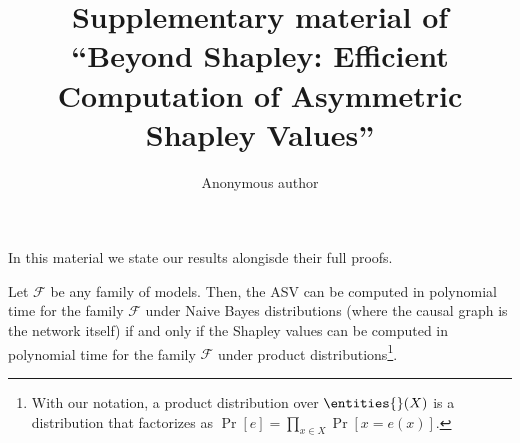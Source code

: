 \documentclass{llncs}
\begin{document}
%
\title{Supplementary material of ``Beyond Shapley: Efficient Computation of Asymmetric Shapley Values''}

%
\author{Anonymous author}
%
%
%
\maketitle              %
%



In this material we state our results alongisde their full proofs.

\begin{theorem}\label{the:asv_naive_bayes_tractable_clean}
	Let $\mathcal{F}$ be any family of models. Then, the ASV can be computed in polynomial time for the family $\mathcal{F}$ under Naive Bayes distributions (where the causal graph is the network itself) if and only if the Shapley values can be computed in polynomial time for the family $\mathcal{F}$ under product distributions\footnote{With our notation, a product distribution over $\entities{}(X)$ is a distribution that factorizes as $\Pr\left[e\right] = \prod_{x \in X}\Pr\left[ x = e(x) \right]$.}.
\end{theorem}
\end{document}
